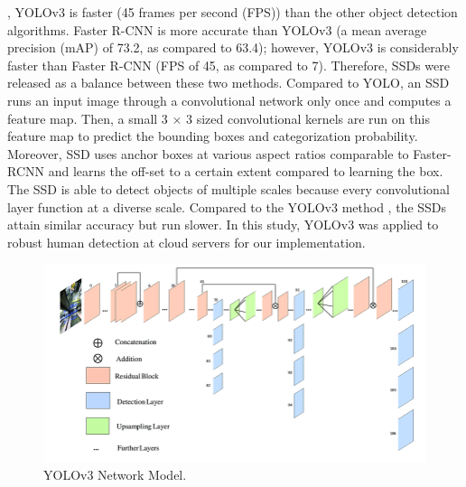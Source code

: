 \cite{redmon2018yolov3}, YOLOv3 is faster (45 frames per second (FPS)) than the other object detection algorithms. Faster R-CNN is more accurate than YOLOv3 (a mean average precision (mAP) of 73.2, as compared to 63.4); however, YOLOv3 is considerably faster than Faster R-CNN (FPS of 45, as compared to 7). Therefore, SSDs  \cite{liu2016ssd} were released as a balance between these two methods. Compared to YOLO, an SSD runs an input image through a convolutional network only once and computes a feature map. Then, a small 3 × 3 sized convolutional kernels are run on this feature map to predict the bounding boxes and categorization probability. Moreover, SSD uses anchor boxes at various aspect ratios comparable to Faster-RCNN and learns the off-set to a certain extent compared to learning the box. The SSD is able to detect objects of multiple scales because every convolutional layer function at a diverse scale. Compared to the YOLOv3 method \cite{redmon2018yolov3}, the SSDs attain similar accuracy but run slower. In this study, YOLOv3 was applied to robust human detection at cloud servers for our implementation. 

\begin{figure}
\centering
 \includegraphics[width=1.0\linewidth]{Figures/yolov3.png}
 \caption{YOLOv3 Network Model.}
 \label{fig:yolov3}
\end{figure}
